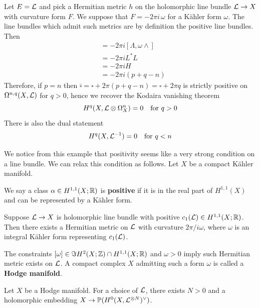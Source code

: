 \documentclass[12pt]{article}
\begin{document}
\begin{example}
    Let $E = {\mathcal{L}}$ and pick a Hermitian metric $h$ on the holomorphic line bundle ${\mathcal{L}}\to X$ with curvature form $F$. We suppose that $F = -2\pi i \,\omega$ for a Kähler form $\omega$. The line bundles which admit such metrics are by definition the positive line bundles. Then
    \begin{align*}
    [\Lambda, F\wedge]
    &= -2\pi i [\Lambda, \omega\wedge] \\
    &= -2\pi i L^* L \\
    &= -2\pi i H \\
    &= -2\pi i (p+q - n)
    \end{align*}
    Therefore, if $p=n$ then $\bar\square = \square + 2\pi (p+q - n) = \square + 2\pi q$ is strictly positive on $\Omega^{n,q}(X,{\mathcal{L}})$ for $q>0$, hence we recover the Kodaira vanishing theorem
    \[
    H^q(X, {\mathcal{L}}\otimes \Omega^n_X) = 0
    \quad\text{for } q>0
    \]
    There is also the dual statement
    \[
    H^q(X, {\mathcal{L}}^{-1}) = 0
    \quad\text{for } q < n
    \]
\end{example}

We notice from this example that positivity seems like a very strong condition on a line bundle. We can relax this condition as follows.
Let $X$ be a compact Kähler manifold.

\begin{definition}
    We say a class $\alpha\in H^{1,1}(X;\mathbb{R})$ is \textbf{positive} if it is in the real part of $H^{1,1}(X)$ and can be represented by a Kähler form.
\end{definition}

\begin{theorem}
    Suppose ${\mathcal{L}} \to X$ is holomorphic line bundle with positive $c_1({\mathcal{L}})\in H^{1,1}(X;\mathbb{R})$. Then there exists a Hermitian metric on ${\mathcal{L}}$ with curvature $2\pi/i \omega$, where $\omega$ is an integral Kähler form representing $c_1({\mathcal{L}})$.
\end{theorem}

\begin{remark}
    The constraints $[\omega]\in \Im H^2(X;\mathbb{Z}) \cap H^{1,1}(X;\mathbb{R})$ and $\omega>0$ imply such Hermitian metric exists on ${\mathcal{L}}$. A compact complex $X$ admitting such a form $\omega$ is called a \textbf{Hodge manifold}.
\end{remark}

\begin{theorem}
     Let $X$ be a Hodge manifold. For a choice of ${\mathcal{L}}$, there exists $N>0$ and a holomorphic embedding $X \to \mathbb{P}(H^0(X,{\mathcal{L}}^{\otimes N})^\vee)$.
\end{theorem}
\end{document}
